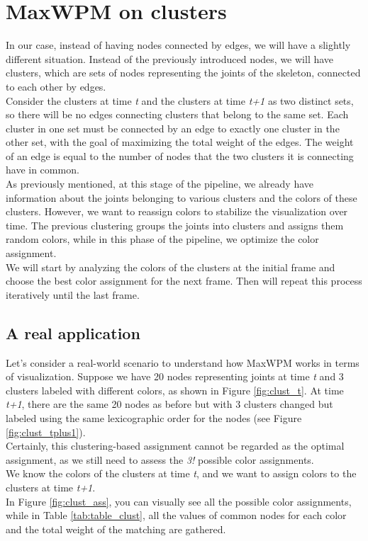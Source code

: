 \section{MaxWPM on clusters}
In our case, instead of having nodes connected by edges, we will have a slightly different situation.
Instead of the previously introduced nodes, we will have clusters, which are sets of nodes representing the joints of the skeleton, connected to each other by edges.\\  
Consider the clusters at time \textit{t} and the clusters at time \textit{t+1} as two distinct sets, so there will be no edges connecting clusters that belong to the same set.
Each cluster in one set must be connected by an edge to exactly one cluster in the other set, with the goal of maximizing the total weight of the edges.
The weight of an edge is equal to the number of nodes that the two clusters it is connecting have in common.\\
As previously mentioned, at this stage of the pipeline, we already have information about the joints belonging to various clusters and the colors of these clusters. However, we want to reassign colors to stabilize the visualization over time.
The previous clustering groups the joints into clusters and assigns them random colors, while in this phase of the pipeline, we optimize the color assignment.\\
We will start by analyzing the colors of the clusters at the initial frame and choose the best color assignment for the next frame.
Then will repeat this process iteratively until the last frame.


\subsection{A real application}
Let's consider a real-world scenario to understand how MaxWPM works in terms of visualization.
Suppose we have 20 nodes representing joints at time \textit{t} and 3 clusters labeled with different colors, as shown in Figure \ref{fig:clust_t}.
At time \textit{t+1}, there are the same 20 nodes as before but with 3 clusters changed but labeled using the same lexicographic order for the nodes (see Figure \ref{fig:clust_tplus1}). \\
Certainly, this clustering-based assignment cannot be regarded as the optimal assignment, as we still need to assess the \textit{3!} possible color assignments. \\
We know the colors of the clusters at time \textit{t}, and we want to assign colors to the clusters at time \textit{t+1}. \\
In Figure \ref{fig:clust_ass}, you can visually see all the possible color assignments, while in Table \ref{tab:table_clust}, all the values of common nodes for each color and the total weight of the matching are gathered.


